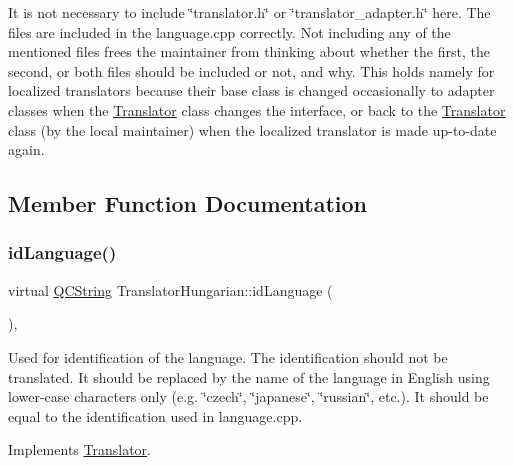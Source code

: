 It is not necessary to include \char`\"{}translator.\+h\char`\"{} or \char`\"{}translator\+\_\+adapter.\+h\char`\"{} here. The files are included in the language.\+cpp correctly. Not including any of the mentioned files frees the maintainer from thinking about whether the first, the second, or both files should be included or not, and why. This holds namely for localized translators because their base class is changed occasionally to adapter classes when the \mbox{\hyperlink{class_translator}{Translator}} class changes the interface, or back to the \mbox{\hyperlink{class_translator}{Translator}} class (by the local maintainer) when the localized translator is made up-\/to-\/date again. 

\subsection{Member Function Documentation}
\mbox{\label{class_translator_hungarian_aa36313a735b7c2bda090943922a486ba}} 
\subsubsection{\texorpdfstring{idLanguage()}{idLanguage()}}
{\footnotesize\ttfamily virtual \mbox{\hyperlink{class_q_c_string}{Q\+C\+String}} Translator\+Hungarian\+::id\+Language (\begin{DoxyParamCaption}{ }\end{DoxyParamCaption})\hspace{0.3cm}{\ttfamily [inline]}, {\ttfamily [virtual]}}

Used for identification of the language. The identification should not be translated. It should be replaced by the name of the language in English using lower-\/case characters only (e.\+g. \char`\"{}czech\char`\"{}, \char`\"{}japanese\char`\"{}, \char`\"{}russian\char`\"{}, etc.). It should be equal to the identification used in language.\+cpp. 

Implements \mbox{\hyperlink{class_translator}{Translator}}.

\mbox{\label{class_translator_hungarian_a762fc8ed682597e4f4dea4091b8b52be}} 
